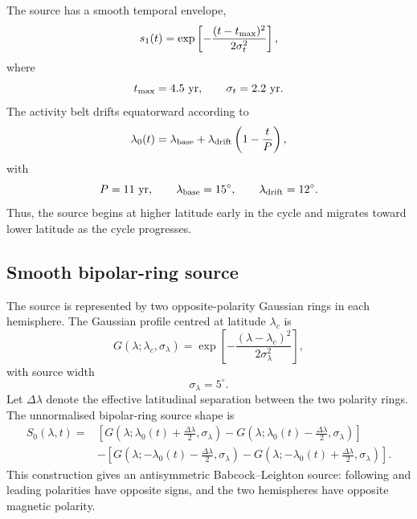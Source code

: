 \documentclass[namedreferences,hyperref,optionalrh,solaromanenum]{spr-sola}
\begin{document}
The source has a smooth temporal envelope,
%
\begin{equation}
s_1(t)
=
\exp
\left[
-\frac{(t-t_{\rm max})^2}{2\sigma_t^2}
\right],
\label{eq:cycle_envelope}
\end{equation}
%
where
%
\begin{equation}
t_{\rm max}=4.5~{\rm yr},
\qquad
\sigma_t=2.2~{\rm yr}.
\label{eq:cycle_envelope_params}
\end{equation}
%
The activity belt drifts equatorward according to
%
\begin{equation}
\lambda_0(t)
=
\lambda_{\rm base}
+
\lambda_{\rm drift}
\left(
1-\frac{t}{P}
\right),
\label{eq:activity_belt}
\end{equation}
%
with
%
\begin{equation}
P=11~{\rm yr},
\qquad
\lambda_{\rm base}=15^\circ,
\qquad
\lambda_{\rm drift}=12^\circ.
\label{eq:activity_belt_params}
\end{equation}
%
Thus, the source begins at higher latitude early in the cycle and migrates
toward lower latitude as the cycle progresses.

\subsection{Smooth bipolar-ring source}
\label{subsec:bipolar_ring_source}

The source is represented by two opposite-polarity Gaussian rings in each
hemisphere. The Gaussian profile centred at latitude $\lambda_c$ is
%
\begin{equation}
G(\lambda;\lambda_c,\sigma_\lambda)
=
\exp
\left[
-\frac{(\lambda-\lambda_c)^2}{2\sigma_\lambda^2}
\right],
\label{eq:gaussian_ring}
\end{equation}
%
with source width
%
\begin{equation}
\sigma_\lambda=5^\circ .
\label{eq:source_width}
\end{equation}
%
Let $\Delta\lambda$ denote the effective latitudinal separation between the
two polarity rings. The unnormalised bipolar-ring source shape is
%
\begin{align}
S_0(\lambda,t)
=&
\left[
G\left(\lambda;\lambda_0(t)+\frac{\Delta\lambda}{2},\sigma_\lambda\right)
-
G\left(\lambda;\lambda_0(t)-\frac{\Delta\lambda}{2},\sigma_\lambda\right)
\right]
\nonumber\\
&-
\left[
G\left(\lambda;-\lambda_0(t)-\frac{\Delta\lambda}{2},\sigma_\lambda\right)
-
G\left(\lambda;-\lambda_0(t)+\frac{\Delta\lambda}{2},\sigma_\lambda\right)
\right].
\label{eq:source_shape}
\end{align}
%
This construction gives an antisymmetric Babcock--Leighton source:
following and leading polarities have opposite signs, and the two
hemispheres have opposite magnetic polarity.
\end{document}

